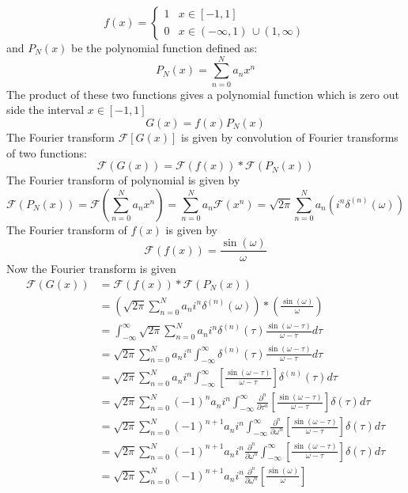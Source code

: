 \documentclass[prd,preprintnumbers,twocolumn,eqsecnum,floatfix,letter]{revtex4}
\begin{document}
\[ f(x) =  \left\{
\begin{array}{ll}
1 & x \in [-1, 1] \\
0 & x \in (-\infty, 1) \, \cup (1, \infty)
\end{array} 
\right. \]
and $P_{N}(x)$ be the polynomial function defined as:
\begin{equation}
	P_{N}(x) = \sum_{n = 0}^{N}a_n x^n  \nonumber
\end{equation}
The product of these two functions gives a polynomial function which is zero out side the interval $x \in [-1, 1]$
\begin{equation}
	G(x) = f(x)P_N(x)\nonumber
\end{equation}
The Fourier transform $\mathscr{F}[G(x)]$ is given by convolution of Fourier transforms of two functions:
\begin{equation}
	\mathscr{F}(G(x)) = \mathscr{F}(f(x))*\mathscr{F}(P_N(x)) \nonumber
\end{equation}
The Fourier transform of polynomial is given by
\begin{equation}
	\mathscr{F}(P_N(x)) =  \mathscr{F}\left(\sum_{n=0}^{N} a_n x^n\right) = \sum_{n=0}^{N}a_n\mathscr{F}\left(x^n\right)= \sqrt{2\pi}\sum_{n=0}^{N}a_n\left(i^n\delta^{(n)}(\omega)
	\right) \nonumber
\end{equation}
The Fourier transform of $f(x)$ is given by
\begin{equation}
	\mathscr{F}\left(f(x)\right) = \frac{\sin(\omega)}{\omega} \nonumber
\end{equation}
Now the Fourier transform is given 
\begin{align}
	\mathscr{F}(G(x)) &= \mathscr{F}(f(x))*\mathscr{F}(P_N(x)) \nonumber\\ 
	& = \left(\sqrt{2\pi}\sum_{n=0}^{N}a_n i^n \delta^{(n)}(\omega)\right)*\left(\frac{\sin(\omega)}{\omega}\right) \nonumber \\
	& = \int_{-\infty}^{\infty}\sqrt{2\pi}\sum_{n=0}^{N}a_n i^n \delta^{(n)}(\tau)\frac{\sin(\omega-\tau)}{\omega-\tau}d\tau \nonumber \\
	& = \sqrt{2\pi}\sum_{n=0}^{N}a_n i^n\int_{-\infty}^{\infty} \delta^{(n)}(\tau)\frac{\sin(\omega-\tau)}{\omega-\tau}d\tau \nonumber
	\\
	& = \sqrt{2\pi}\sum_{n=0}^{N}a_n i^n\int_{-\infty}^{\infty}\left[ \frac{\sin(\omega-\tau)}{\omega-\tau}\right]\delta^{(n)}(\tau)d\tau \nonumber
	\\
	& = \sqrt{2\pi}\sum_{n=0}^{N}(-1)^{n}a_n i^n\int_{-\infty}^{\infty}\frac{\partial^n}{\partial \tau^n}\left[ \frac{\sin(\omega-\tau)}{\omega-\tau}\right]\delta(\tau)d\tau \nonumber
	\\
	& = \sqrt{2\pi}\sum_{n=0}^{N}(-1)^{n+1}a_n i^n\int_{-\infty}^{\infty}\frac{\partial^n}{\partial \omega^n}\left[ \frac{\sin(\omega-\tau)}{\omega-\tau}\right]\delta(\tau)d\tau \nonumber
	\\
	& = \sqrt{2\pi}\sum_{n=0}^{N}(-1)^{n+1}a_n i^n\frac{\partial^n}{\partial \omega^n}\int_{-\infty}^{\infty}\left[ \frac{\sin(\omega-\tau)}{\omega-\tau}\right]\delta(\tau)d\tau \nonumber
	\\
	& = \sqrt{2\pi}\sum_{n=0}^{N}(-1)^{n+1}a_n i^n\frac{\partial^n}{\partial \omega^n}\left[ \frac{\sin(\omega)}{\omega}\right] \nonumber
\end{align}
\end{document}
